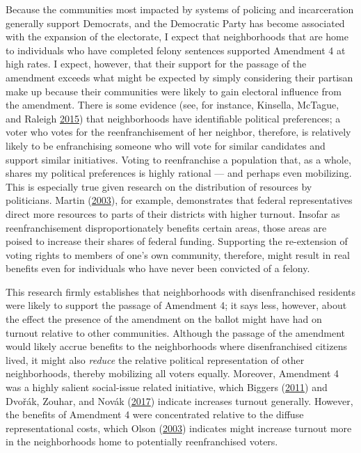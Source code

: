 \documentclass[
  12pt,
]{article}
\begin{document}
Because the communities most impacted by systems of policing and incarceration generally support Democrats, and the Democratic Party has become associated with the expansion of the electorate, I expect that neighborhoods that are home to individuals who have completed felony sentences supported Amendment 4 at high rates. I expect, however, that their support for the passage of the amendment exceeds what might be expected by simply considering their partisan make up because their communities were likely to gain electoral influence from the amendment. There is some evidence (see, for instance, Kinsella, McTague, and Raleigh \protect\hyperlink{ref-Kinsella2015}{2015}) that neighborhoods have identifiable political preferences; a voter who votes for the reenfranchisement of her neighbor, therefore, is relatively likely to be enfranchising someone who will vote for similar candidates and support similar initiatives. Voting to reenfranchise a population that, as a whole, shares my political preferences is highly rational --- and perhaps even mobilizing. This is especially true given research on the distribution of resources by politicians. Martin (\protect\hyperlink{ref-Martin2003}{2003}), for example, demonstrates that federal representatives direct more resources to parts of their districts with higher turnout. Insofar as reenfranchisement disproportionately benefits certain areas, those areas are poised to increase their shares of federal funding. Supporting the re-extension of voting rights to members of one's own community, therefore, might result in real benefits even for individuals who have never been convicted of a felony.

This research firmly establishes that neighborhoods with disenfranchised residents were likely to support the passage of Amendment 4; it says less, however, about the effect the presence of the amendment on the ballot might have had on turnout relative to other communities. Although the passage of the amendment would likely accrue benefits to the neighborhoods where disenfranchised citizens lived, it might also \emph{reduce} the relative political representation of other neighborhoods, thereby mobilizing all voters equally. Moreover, Amendment 4 was a highly salient social-issue related initiative, which Biggers (\protect\hyperlink{ref-Biggers2011}{2011}) and Dvořák, Zouhar, and Novák (\protect\hyperlink{ref-Dvorak2017}{2017}) indicate increases turnout generally. However, the benefits of Amendment 4 were concentrated relative to the diffuse representational costs, which Olson (\protect\hyperlink{ref-Olson2003}{2003}) indicates might increase turnout more in the neighborhoods home to potentially reenfranchised voters.
\end{document}
